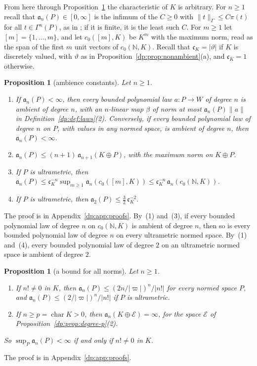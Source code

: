\documentclass[11pt]{amsart}
\newtheorem{proposition}[theorem]{Proposition}
\theoremstyle{definition}
\theoremstyle{remark}
\numberwithin{equation}{section}
\newcommand{\N}{\mathbb N}
\newcommand{\abs}[1]{\lvert #1\rvert}
\newcommand{\norm}[1]{\lVert #1\rVert}
\theoremstyle{plain}
\theoremstyle{definition}
\theoremstyle{plain}
\begin{document}
From here through Proposition~\ref{dp:prop:all-norms} the characteristic of $K$ is arbitrary. For $n\ge1$ recall that $\mathfrak a_n(P)\in[0,\infty]$ is the infimum of the $C\ge0$ with $\norm t_\Gamma\le C\pi(t)$ for all $t\in\Gamma^n(P)$, as in \cite[Definition~14.36]{I}; if it is finite, it is the least such $C$. For $m\ge1$ let $[m]=\{1,\dots,m\}$, and let $c_0([m],K)$ be $K^m$ with the maximum norm, read as the span of the first $m$ unit vectors of $c_0(\N,K)$. Recall that $\mathfrak c_K=\abs\vartheta$ if $K$ is discretely valued, with $\vartheta$ as in Proposition~\ref{dp:prop:nonambient}(a), and $\mathfrak c_K=1$ otherwise.

\begin{proposition}[ambience constants]\label{dp:prop:ultrametric}
Let $n\ge1$.
\begin{enumerate}
\item If $\mathfrak a_n(P)<\infty$, then every bounded polynomial law $a\colon P\to W$ of degree $n$ is ambient of degree $n$, with an $n$\nobreakdash-linear map $\beta$ of norm at most $\mathfrak a_n(P)\norm a$ in Definition~\ref{dp:def:laws}(2). Conversely, if every bounded polynomial law of degree $n$ on $P$, with values in any normed space, is ambient of degree $n$, then $\mathfrak a_n(P)<\infty$.
\item $\mathfrak a_n(P)\le(n+1)\,\mathfrak a_{n+1}(K\oplus P)$, with the maximum norm on $K\oplus P$.
\item If $P$ is ultrametric, then $\mathfrak a_n(P)\le\mathfrak c_K^{-n}\sup_{m\ge1}\mathfrak a_n(c_0([m],K))\le\mathfrak c_K^{-n}\,\mathfrak a_n(c_0(\N,K))$.
\item If $P$ is ultrametric, then $\mathfrak a_2(P)\le\frac32\,\mathfrak c_K^{-2}$.
\end{enumerate}
\end{proposition}
The proof is in Appendix~\ref{dp:app:proofs}. By~(1) and~(3), if every bounded polynomial law of degree $n$ on $c_0(\N,K)$ is ambient of degree $n$, then so is every bounded polynomial law of degree $n$ on every ultrametric normed space. By~(1) and~(4), every bounded polynomial law of degree $2$ on an ultrametric normed space is ambient of degree $2$.

\begin{proposition}[a bound for all norms]\label{dp:prop:all-norms}
Let $n\ge1$.
\begin{enumerate}
\item If $n!\ne0$ in $K$, then $\mathfrak a_n(P)\le(2n/\abs\varpi)^n/\abs{n!}$ for every normed space $P$, and $\mathfrak a_n(P)\le(2/\abs\varpi)^n/\abs{n!}$ if $P$ is ultrametric.
\item If $n\ge p=\operatorname{char}K>0$, then $\mathfrak a_n(K\oplus\mathcal E)=\infty$, for the space $\mathcal E$ of Proposition~\ref{dp:prop:degree-p}(2).
\end{enumerate}
So $\sup_P\mathfrak a_n(P)<\infty$ if and only if $n!\ne0$ in $K$.
\end{proposition}
The proof is in Appendix~\ref{dp:app:proofs}.
\end{document}
